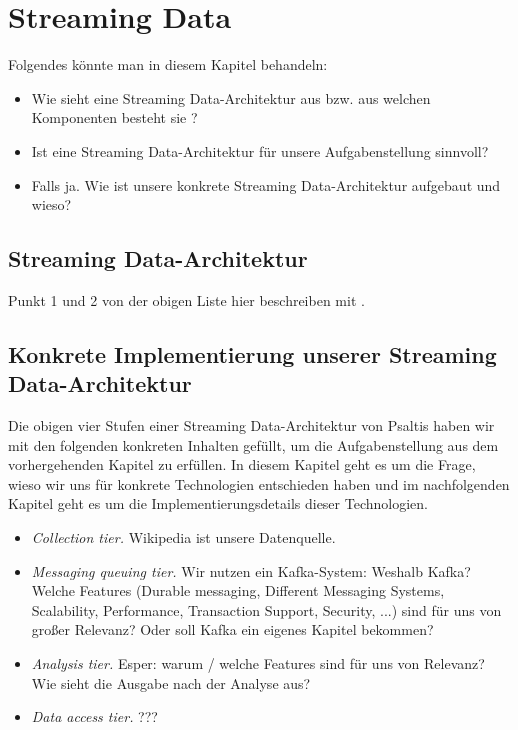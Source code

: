 \section{Streaming Data}
Folgendes könnte man in diesem Kapitel behandeln:

\begin{itemize}
    \item Wie sieht eine Streaming Data-Architektur aus bzw. aus welchen Komponenten besteht sie \cite{psaltis2017streaming}?
    \item Ist eine Streaming Data-Architektur für unsere Aufgabenstellung sinnvoll?
    \item Falls ja. Wie ist unsere konkrete Streaming Data-Architektur aufgebaut und wieso?
\end{itemize}



\subsection{Streaming Data-Architektur}
Punkt 1 und 2 von der obigen Liste hier beschreiben mit \cite{psaltis2017streaming}.



\subsection{Konkrete Implementierung unserer Streaming Data-Architektur}
Die obigen vier Stufen einer Streaming Data-Architektur von Psaltis \cite{psaltis2017streaming}
haben wir mit den folgenden konkreten Inhalten gefüllt, um die Aufgabenstellung aus dem vorhergehenden Kapitel zu erfüllen.
In diesem Kapitel geht es um die Frage, wieso wir uns für konkrete Technologien entschieden haben und im nachfolgenden Kapitel
geht es um die Implementierungsdetails dieser Technologien.
\begin{itemize}
    \item \textit{Collection tier.} Wikipedia ist unsere Datenquelle.
    \item \textit{Messaging queuing tier.} Wir nutzen ein Kafka-System: Weshalb Kafka? Welche Features
        (Durable messaging, Different Messaging Systems, Scalability, Performance, Transaction Support, Security, ...) sind für uns von großer Relevanz?
        Oder soll Kafka ein eigenes Kapitel bekommen?
    \item \textit{Analysis tier.} Esper: warum / welche Features sind für uns von Relevanz? Wie sieht die Ausgabe nach der Analyse aus?
    \item \textit{Data access tier.} ???
\end{itemize}
